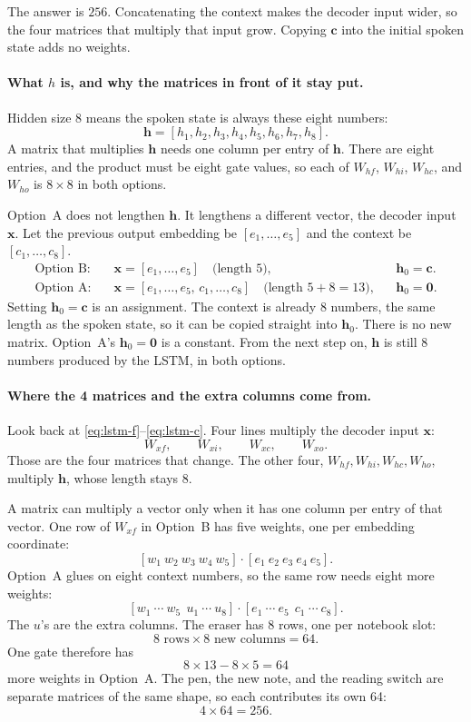 \documentclass[11pt]{article}
\begin{document}
The answer is \(256\). Concatenating the context makes the decoder input
wider, so the four matrices that multiply that input grow. Copying
\(\mathbf{c}\) into the initial spoken state adds no weights.

\paragraph{What \(h\) is, and why the matrices in front of it stay put.}
Hidden size 8 means the spoken state is always these eight numbers:
\[
\mathbf{h}
=
[h_1,h_2,h_3,h_4,h_5,h_6,h_7,h_8].
\]
A matrix that multiplies \(\mathbf{h}\) needs one column per entry of
\(\mathbf{h}\). There are eight entries, and the product must be eight gate
values, so each of \(W_{hf}\), \(W_{hi}\), \(W_{hc}\), and \(W_{ho}\) is
\(8\times 8\) in both options.

Option~A does not lengthen \(\mathbf{h}\). It lengthens a different vector,
the decoder input \(\mathbf{x}\). Let the previous output embedding be
\([e_1,\ldots,e_5]\) and the context be \([c_1,\ldots,c_8]\).
\begin{align*}
\text{Option B:}&\quad
\mathbf{x}=[e_1,\ldots,e_5]
\quad\text{(length 5)},
&&
\mathbf{h}_0=\mathbf{c}.
\\
\text{Option A:}&\quad
\mathbf{x}=[e_1,\ldots,e_5,\,c_1,\ldots,c_8]
\quad\text{(length \(5+8=13\))},
&&
\mathbf{h}_0=\mathbf{0}.
\end{align*}
Setting \(\mathbf{h}_0=\mathbf{c}\) is an assignment. The context is
already 8 numbers, the same length as the spoken state, so it can be copied
straight into \(\mathbf{h}_0\). There is no new matrix. Option~A's
\(\mathbf{h}_0=\mathbf{0}\) is a constant. From the next step on,
\(\mathbf{h}\) is still 8 numbers produced by the LSTM, in both options.

\paragraph{Where the 4 matrices and the extra columns come from.}
Look back at \eqref{eq:lstm-f}--\eqref{eq:lstm-c}. Four lines multiply the
decoder input \(\mathbf{x}\):
\[
W_{xf},\qquad W_{xi},\qquad W_{xc},\qquad W_{xo}.
\]
Those are the four matrices that change. The other four,
\(W_{hf},W_{hi},W_{hc},W_{ho}\), multiply \(\mathbf{h}\), whose length stays
8.

A matrix can multiply a vector only when it has one column per entry of
that vector. One row of \(W_{xf}\) in Option~B has five weights, one per
embedding coordinate:
\[
[w_1\ w_2\ w_3\ w_4\ w_5]
\cdot
[e_1\ e_2\ e_3\ e_4\ e_5].
\]
Option~A glues on eight context numbers, so the same row needs eight more
weights:
\[
[w_1\ \cdots\ w_5\ \ u_1\ \cdots\ u_8]
\cdot
[e_1\ \cdots\ e_5\ \ c_1\ \cdots\ c_8].
\]
The \(u\)'s are the extra columns. The eraser has 8 rows, one per notebook
slot:
\[
8\text{ rows}\times 8\text{ new columns}=64.
\]
One gate therefore has
\[
8\times 13-8\times 5=64
\]
more weights in Option~A. The pen, the new note, and the reading switch are
separate matrices of the same shape, so each contributes its own 64:
\[
4\times 64=256.
\]
\end{document}
